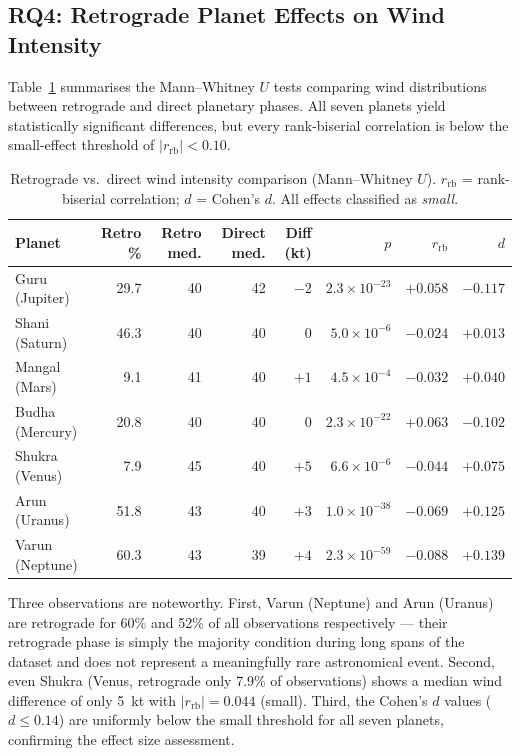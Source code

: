 \documentclass[12pt,a4paper]{article}
\begin{document}
\subsection{RQ4: Retrograde Planet Effects on Wind Intensity}
\label{sec:h4}

Table~\ref{tab:retrograde} summarises the Mann--Whitney $U$ tests comparing
wind distributions between retrograde and direct planetary phases.
All seven planets yield statistically significant differences, but every
rank-biserial correlation is below the small-effect threshold of $|r_\text{rb}| < 0.10$.

\begin{table}[H]
  \centering
  \caption{Retrograde vs.\ direct wind intensity comparison (Mann--Whitney $U$).
           $r_\text{rb}$ = rank-biserial correlation; $d$ = Cohen's $d$.
           All effects classified as \emph{small}.}
  \label{tab:retrograde}
  \begin{tabular}{lrrrrrrr}
    \toprule
    \textbf{Planet} & \textbf{Retro \%} & \textbf{Retro med.} & \textbf{Direct med.} &
    \textbf{Diff (kt)} & \boldmath$p$ & \boldmath$r_\text{rb}$ & \boldmath$d$ \\
    \midrule
    Guru (Jupiter) & 29.7 & 40 & 42 & $-2$ & $2.3\times10^{-23}$ & $+0.058$ & $-0.117$ \\
    Shani (Saturn) & 46.3 & 40 & 40 & $0$  & $5.0\times10^{-6}$  & $-0.024$ & $+0.013$ \\
    Mangal (Mars)  &  9.1 & 41 & 40 & $+1$ & $4.5\times10^{-4}$  & $-0.032$ & $+0.040$ \\
    Budha (Mercury)& 20.8 & 40 & 40 & $0$  & $2.3\times10^{-22}$ & $+0.063$ & $-0.102$ \\
    Shukra (Venus) &  7.9 & 45 & 40 & $+5$ & $6.6\times10^{-6}$  & $-0.044$ & $+0.075$ \\
    Arun (Uranus)  & 51.8 & 43 & 40 & $+3$ & $1.0\times10^{-38}$ & $-0.069$ & $+0.125$ \\
    Varun (Neptune)& 60.3 & 43 & 39 & $+4$ & $2.3\times10^{-59}$ & $-0.088$ & $+0.139$ \\
    \bottomrule
  \end{tabular}
\end{table}

Three observations are noteworthy.
First, Varun (Neptune) and Arun (Uranus) are retrograde for 60\% and 52\% of
all observations respectively — their retrograde phase is simply the
majority condition during long spans of the dataset and does not represent
a meaningfully rare astronomical event.
Second, even Shukra (Venus, retrograde only 7.9\% of observations) shows a
median wind difference of only 5~kt with $|r_\text{rb}| = 0.044$ (small).
Third, the Cohen's $d$ values ($d \leq 0.14$) are uniformly below the small
threshold for all seven planets, confirming the effect size assessment.
\end{document}
